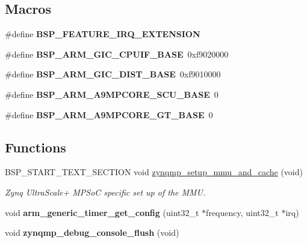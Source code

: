 \subsection*{Macros}
\begin{DoxyCompactItemize}
\item 
\mbox{\label{group__RTEMSBSPsARMZynqMP_ga5d7d631d3a14b7554160f14eb42f351b}} 
\#define {\bfseries B\+S\+P\+\_\+\+F\+E\+A\+T\+U\+R\+E\+\_\+\+I\+R\+Q\+\_\+\+E\+X\+T\+E\+N\+S\+I\+ON}
\item 
\mbox{\label{group__RTEMSBSPsARMZynqMP_ga82979270e5d617859b19ad1830434bb6}} 
\#define {\bfseries B\+S\+P\+\_\+\+A\+R\+M\+\_\+\+G\+I\+C\+\_\+\+C\+P\+U\+I\+F\+\_\+\+B\+A\+SE}~0xf9020000
\item 
\mbox{\label{group__RTEMSBSPsARMZynqMP_ga74b3234f20bb7c846a4b35c68bbb0703}} 
\#define {\bfseries B\+S\+P\+\_\+\+A\+R\+M\+\_\+\+G\+I\+C\+\_\+\+D\+I\+S\+T\+\_\+\+B\+A\+SE}~0xf9010000
\item 
\mbox{\label{group__RTEMSBSPsARMZynqMP_ga180004170c65ed2eaa91050be70aa480}} 
\#define {\bfseries B\+S\+P\+\_\+\+A\+R\+M\+\_\+\+A9\+M\+P\+C\+O\+R\+E\+\_\+\+S\+C\+U\+\_\+\+B\+A\+SE}~0
\item 
\mbox{\label{group__RTEMSBSPsARMZynqMP_gafdfd032028e40b1b0e2fcdbcebf24250}} 
\#define {\bfseries B\+S\+P\+\_\+\+A\+R\+M\+\_\+\+A9\+M\+P\+C\+O\+R\+E\+\_\+\+G\+T\+\_\+\+B\+A\+SE}~0
\end{DoxyCompactItemize}
\subsection*{Functions}
\begin{DoxyCompactItemize}
\item 
B\+S\+P\+\_\+\+S\+T\+A\+R\+T\+\_\+\+T\+E\+X\+T\+\_\+\+S\+E\+C\+T\+I\+ON void \mbox{\hyperlink{group__RTEMSBSPsARMZynqMP_gab627dbb0ad83044bd6441e834db2350c}{zynqmp\+\_\+setup\+\_\+mmu\+\_\+and\+\_\+cache}} (void)
\begin{DoxyCompactList}\small\item\em Zynq Ultra\+Scale+ M\+P\+SoC specific set up of the M\+MU. \end{DoxyCompactList}\item 
\mbox{\label{group__RTEMSBSPsARMZynqMP_ga371b5f674b0ec4957ef0fee036cf6897}} 
void {\bfseries arm\+\_\+generic\+\_\+timer\+\_\+get\+\_\+config} (uint32\+\_\+t $\ast$frequency, uint32\+\_\+t $\ast$irq)
\item 
\mbox{\label{group__RTEMSBSPsARMZynqMP_ga72439dc60788ec0fb892942ac93af47d}} 
void {\bfseries zynqmp\+\_\+debug\+\_\+console\+\_\+flush} (void)
\end{DoxyCompactItemize}


